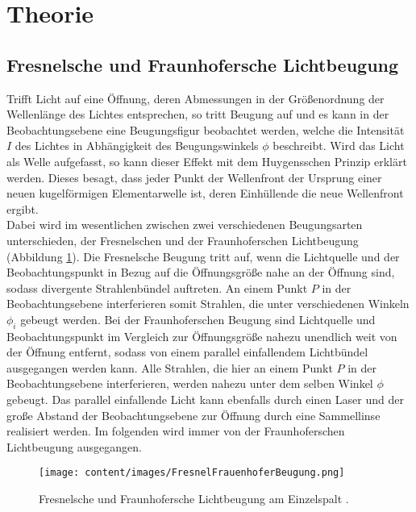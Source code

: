 
\section{Theorie}
\label{sec:Theorie}

\subsection{Fresnelsche und Fraunhofersche Lichtbeugung}

Trifft Licht auf eine Öffnung, deren Abmessungen in der Größenordnung der Wellenlänge des Lichtes entsprechen, so tritt Beugung auf und es kann in der Beobachtungsebene eine Beugungsfigur beobachtet werden, welche die Intensität $I$ des Lichtes in Abhängigkeit des Beugungswinkels $\phi$ beschreibt. 
Wird das Licht als Welle aufgefasst, so kann dieser Effekt mit dem Huygensschen Prinzip erklärt werden. Dieses besagt, dass jeder Punkt der Wellenfront der Ursprung einer neuen kugelförmigen Elementarwelle ist, deren Einhüllende die neue Wellenfront ergibt.\\
Dabei wird im wesentlichen zwischen zwei verschiedenen Beugungsarten unterschieden, der Fresnelschen  und der Fraunhoferschen Lichtbeugung (Abbildung \ref{fig:FFB}). Die Fresnelsche Beugung tritt auf, wenn die Lichtquelle und der Beobachtungspunkt in Bezug auf die Öffnungsgröße nahe an der Öffnung sind, sodass divergente Strahlenbündel auftreten. An einem Punkt $P$ in der Beobachtungsebene interferieren somit Strahlen, die unter verschiedenen Winkeln $\phi_i$ gebeugt werden. Bei der Fraunhoferschen Beugung sind Lichtquelle und Beobachtungspunkt im Vergleich zur Öffnungsgröße nahezu unendlich weit von der Öffnung entfernt, sodass von einem parallel einfallendem Lichtbündel ausgegangen werden kann. Alle Strahlen, die hier an einem Punkt $P$ in der Beobachtungsebene interferieren, werden nahezu unter dem selben Winkel $\phi$ gebeugt. Das parallel einfallende Licht kann ebenfalls durch einen Laser und der große Abstand der Beobachtungsebene zur Öffnung durch eine Sammellinse realisiert werden. Im folgenden wird immer von der Fraunhoferschen Lichtbeugung ausgegangen.

\begin{figure}
	\centering
	\caption{Fresnelsche und Fraunhofersche Lichtbeugung am Einzelspalt \cite{V406}.}
	\texttt{[image: content/images/FresnelFrauenhoferBeugung.png]}
	\label{fig:FFB}
\end{figure}

